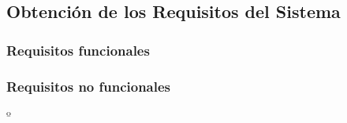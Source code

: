 \subsection{Obtención de los Requisitos del Sistema} \label{sec:6_2-Requisitos}
\hypertarget{sec:6_2-Requisitos}{}

\subsubsection{Requisitos funcionales}













\subsubsection{Requisitos no funcionales}
º
